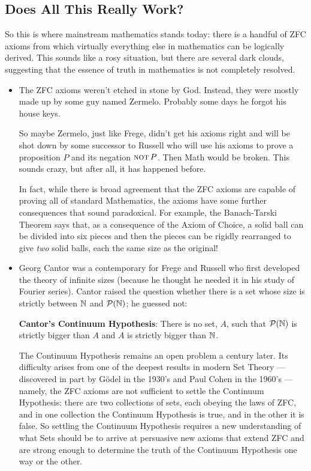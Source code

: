 \subsection{Does All This Really Work?}

So this is where mainstream mathematics stands today: there is a handful
of ZFC axioms from which virtually everything else in mathematics can be
logically derived.  This sounds like a rosy situation, but there are
several dark clouds, suggesting that the essence of truth in mathematics
is not completely resolved.

%
\begin{itemize}

\item The ZFC axioms weren't etched in stone by God.  Instead, they were
  mostly made up by some guy named Zermelo.  Probably some days he forgot
  his house keys.

  So maybe Zermelo, just like Frege, didn't get his axioms right and will
  be shot down by some successor to Russell who will use his axioms to
  prove a proposition $P$ and its negation $\mathop{\mathrm{\textsc{not}}} P$.  Then Math would be
  broken.  This sounds crazy, but after all, it has happened before.

  In fact, while there is broad agreement that the ZFC axioms are capable
  of proving all of standard Mathematics, the axioms have some further
  consequences that sound paradoxical.  For example, the Banach-Tarski
  Theorem says that, as a consequence of the Axiom of Choice, a solid ball
  can be divided into six pieces and then the pieces can be rigidly
  rearranged to give \textit{two} solid balls, each the same size as the
  original!

\item Georg Cantor was a contemporary for Frege and Russell who first
  developed the theory of infinite sizes (because he thought he needed it
  in his study of Fourier series).  Cantor raised the question whether
  there is a set whose size is strictly between $\mathbb{N}$ and
  $\mathcal{P}(\mathbb{N})$; he guessed not:

\textbf{Cantor's Continuum Hypothesis}: There is no set, $A$, such that
$\mathcal{P}(\mathbb{N})$ is strictly bigger than $A$ and $A$ is strictly bigger
than $\mathbb{N}$.

The Continuum Hypothesis remains an open problem a century later.  Its
difficulty arises from one of the deepest results in modern Set Theory
---discovered in part by G\"odel in the 1930's and Paul Cohen in the
1960's ---namely, the ZFC axioms are not sufficient to settle the
Continuum Hypothesis: there are two collections of sets, each obeying the
laws of ZFC, and in one collection the Continuum Hypothesis is true, and
in the other it is false.  So settling the Continuum Hypothesis requires a
new understanding of what Sets should be to arrive at persuasive new
axioms that extend ZFC and are strong enough to determine the truth of the
Continuum Hypothesis one way or the other.


\end{itemize}
